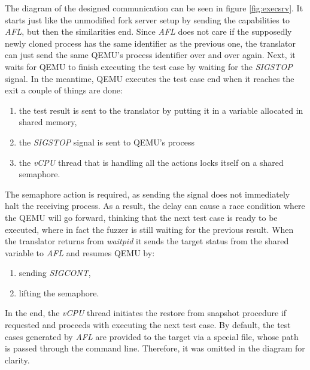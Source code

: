 The diagram of the designed communication can be seen in figure \ref{fig:execsrv}. It starts just like the unmodified fork server setup by sending the capabilities to \textit{AFL}, but then the similarities end. Since \textit{AFL} does not care if the supposedly newly cloned process has the same identifier as the previous one, the translator can just send the same QEMU's process identifier over and over again. Next, it waits for QEMU to finish executing the test case by waiting for the \textit{SIGSTOP} signal. In the meantime, QEMU executes the test case end when it reaches the exit a couple of things are done:
\begin{enumerate}
    \item the test result is sent to the translator by putting it in a variable allocated in shared memory,
    \item the \textit{SIGSTOP} signal is sent to QEMU's process
    \item the \textit{vCPU} thread that is handling all the actions locks itself on a shared semaphore.
\end{enumerate}
The semaphore action is required, as sending the signal does not immediately halt the receiving process. As a result, the delay can cause a race condition where the QEMU will go forward, thinking that the next test case is ready to be executed, where in fact the fuzzer is still waiting for the previous result. When the translator returns from \textit{waitpid} it sends the target status from the shared variable to \textit{AFL} and resumes QEMU by:
\begin{enumerate}
    \item sending \textit{SIGCONT},
    \item lifting the semaphore.
\end{enumerate}
In the end, the \textit{vCPU} thread initiates the restore from snapshot procedure if requested and proceeds with executing the next test case. By default, the test cases generated by \textit{AFL} are provided to the target via a special file, whose path is passed through the command line. Therefore, it was omitted in the diagram for clarity.


